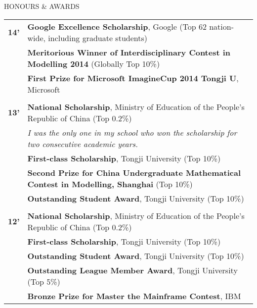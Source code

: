 \documentclass{resume} %
\begin{document}

\begin{rSection}{HONOURS \& AWARDS}

  \begin{tabular}{ @{} >{\bfseries}l @{\hspace{3ex}} l }
    14' & {\bf Google Excellence Scholarship}, Google (Top 62 nation-wide, including graduate students)     \\
        & {\bf Meritorious Winner of Interdisciplinary Contest in Modelling 2014} (Globally Top 10\%)       \\
        & {\bf First Prize for Microsoft ImagineCup 2014 Tongji U}, Microsoft                               \\
        &                                                                                                   \\
    13' & {\bf National Scholarship}, Ministry of Education of the People’s Republic of China (Top 0.2\%)   \\
        & {\em \space\space\space\space I was the only one in my school who won the scholarship for two consecutive academic years.} \\
        & {\bf First-class Scholarship}, Tongji University (Top 10\%)                                       \\
        & {\bf Second Prize for China Undergraduate Mathematical Contest in Modelling, Shanghai} (Top 10\%) \\
        & {\bf Outstanding Student Award}, Tongji University (Top 10\%)                                     \\
        &                                                                                                   \\
    12' & {\bf National Scholarship}, Ministry of Education of the People’s Republic of China (Top 0.2\%)   \\
        & {\bf First-class Scholarship}, Tongji University (Top 10\%)                                       \\
        & {\bf Outstanding Student Award}, Tongji University (Top 10\%)                                     \\
        & {\bf Outstanding League Member Award}, Tongji University (Top 5\%)                                \\
        & {\bf Bronze Prize for Master the Mainframe Contest}, IBM                                          \\
  \end{tabular}

\end{rSection}
\end{document}
